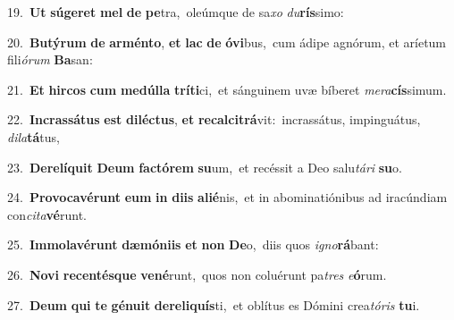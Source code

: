 {{\numbfont\textcolor{\numbcolor}{19.}}~\textbf{Ut} \textbf{sú}\-\textbf{ge}\textbf{ret} \textbf{mel} \textbf{de} \textbf{pe}\-tra,~\star oleúmque de sa\textit{xo} \textit{du}\-\textbf{rís}simo:\par
{\numbfont\textcolor{\numbcolor}{20.}}~\-\textbf{Bu}\-\textbf{tý}\textbf{rum} \textbf{de} \textbf{ar}\-\textbf{mén}\textbf{to}, \textbf{et} \textbf{lac} \textbf{de} \textbf{ó}\-\textbf{vi}bus,~\star cum ádipe agnórum, et aríetum fili\-\textit{ó}\-\textit{rum} \textbf{Ba}\-san:\par
{\numbfont\textcolor{\numbcolor}{21.}}~\textbf{Et} \textbf{hir}\-\textbf{cos} \textbf{cum} \textbf{me}\-\textbf{dúl}\textbf{la} \textbf{trí}\-\textbf{ti}ci,~\star et sánguinem uvæ bíberet \textit{me}\-\textit{ra}\textbf{cís}simum.\par
{\numbfont\textcolor{\numbcolor}{22.}}~\-\textbf{In}\-\textbf{cras}\textbf{sá}\textbf{tus} \textbf{est} \textbf{di}\-\textbf{léc}\textbf{tus}, \textbf{et} \textbf{re}\-\textbf{cal}\textbf{ci}\textbf{trá}vit:~\star incrassátus, impinguátus, \textit{di}\-\textit{la}\textbf{tá}tus,\par
{\numbfont\textcolor{\numbcolor}{23.}}~\-\textbf{De}\-\textbf{re}\textbf{lí}\textbf{quit} \textbf{De}\-\textbf{um} \textbf{fac}\-\textbf{tó}\textbf{rem} \textbf{su}\-um,~\star et recéssit a Deo salu\-\textit{tá}\-\textit{ri} \textbf{su}\-o.\par
{\numbfont\textcolor{\numbcolor}{24.}}~\-\textbf{Pro}\-\textbf{vo}\textbf{ca}\textbf{vé}\textbf{runt} \textbf{e}\-\textbf{um} \textbf{in} \textbf{di}\-\textbf{is} \textbf{a}\-\textbf{li}\textbf{é}nis,~\star et in abominatiónibus ad iracúndiam con\-\textit{ci}\-\textit{ta}\textbf{vé}runt.\par
{\numbfont\textcolor{\numbcolor}{25.}}~\-\textbf{Im}\-\textbf{mo}\textbf{la}\textbf{vé}\textbf{runt} \textbf{dæ}\-\textbf{mó}\textbf{ni}\textbf{is} \textbf{et} \textbf{non} \textbf{De}\-o,~\star diis quos \textit{i}\-\textit{gno}\textbf{rá}bant:\par
{\numbfont\textcolor{\numbcolor}{26.}}~\-\textbf{No}\-\textbf{vi} \textbf{re}\-\textbf{cen}\textbf{tés}\textbf{que} \textbf{ve}\-\textbf{né}runt,~\star quos non coluérunt pa\textit{tres} \textit{e}\-\textbf{ó}rum.\par
{\numbfont\textcolor{\numbcolor}{27.}}~\-\textbf{De}\-\textbf{um} \textbf{qui} \textbf{te} \textbf{gé}\-\textbf{nu}\textbf{it} \textbf{de}\-\textbf{re}\textbf{li}\textbf{quís}ti,~\star et oblítus es Dómini crea\-\textit{tó}\-\textit{ris} \textbf{tu}\-i.\par
}
